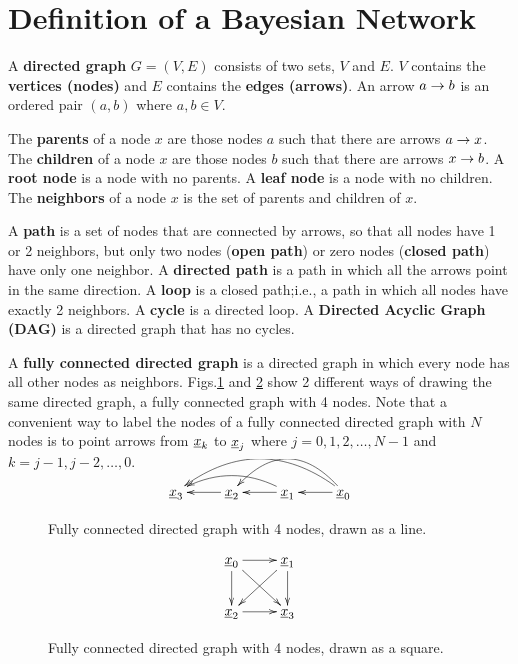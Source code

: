 \section{Definition of a Bayesian Network}
\label{ch-bnet-def}

A {\bf directed graph} $G=(V,E)$
consists of two sets, $V$
and $E$. $V$ contains
the {\bf vertices (nodes)}
and $E$ contains the {\bf edges (arrows)}.
An arrow $a\rightarrow b$ is an
ordered pair 
$(a,b)$ where $a, b\in V$.

The {\bf parents} 
of a node $x$ are 
those nodes $a$
such that there are arrows 
$a\rightarrow x$.
The {\bf children} of a node
$x$
are those nodes $b$
such that there are arrows $x\rightarrow b$.
A {\bf root node}
is a node with no parents.
A {\bf leaf node}
is a node with no children.
The {\bf neighbors}
of a node $x$
is the set of parents and 
children of $x$.

A {\bf path} is a 
set of nodes that 
are connected 
by arrows, so 
that all nodes
have 1 or 2 neighbors,
but only two nodes ({\bf open path})
or zero nodes ({\bf closed path})
have only one neighbor.
A {\bf directed path}
is a path in
which all the arrows point
in the same direction.
A {\bf loop}
is a closed path;i.e.,
a path in which all
nodes have exactly 2 neighbors.
A {\bf cycle} is a directed loop.
A {\bf Directed Acyclic Graph (DAG)}
is a directed graph that has no
cycles. 


A {\bf fully connected directed graph}
is 
a directed graph
in which 
every node has all other 
nodes as neighbors.
Figs.\ref{fig-full-conn-4-line}
and
\ref{fig-full-conn-4-square}
show 2 different
ways of drawing
the same directed graph,
a fully connected graph with 4 nodes.
Note that a convenient
way
to label
the nodes of a fully
connected directed
graph
with $N$ nodes
is to point
arrows
from 
${\underline{x}}_k$ to ${\underline{x}}_j$
where $j=0, 1, 2,\ldots, N-1$
and 
$k=j-1, j-2, \ldots, 0$.


\begin{figure}[h!]
$$
\xymatrix{
\rvx_3
&\rvx_2\ar[l]
&\rvx_1\ar[l]\ar@/_1pc/[ll]
&\rvx_0\ar[l]\ar@/_2pc/[ll]\ar@/_2pc/[lll]
}
$$
\caption{Fully 
connected directed  graph with 4 nodes,
drawn as a line.}
\label{fig-full-conn-4-line}
\end{figure}

\begin{figure}[h!]
$$
\xymatrix{
\rvx_0\ar[r]\ar[d]\ar[rd]&\rvx_1\ar[d]\ar[ld]
\\
\rvx_2\ar[r]&\rvx_3
}
$$
\caption{Fully 
connected directed  graph with 4 nodes,
drawn as a square.}
\label{fig-full-conn-4-square}
\end{figure}

